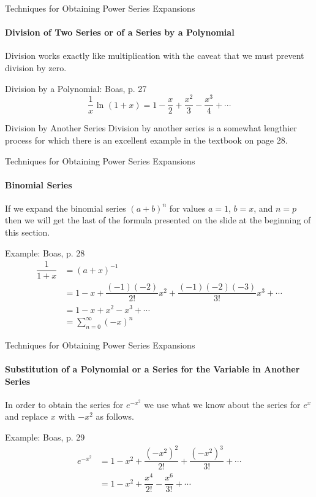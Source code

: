 \documentclass{beamer}
\begin{document}
\begin{frame}{Techniques for Obtaining Power Series Expansions}
    	\framesubtitle{Division of Two Series or of a Series by a Polynomial}
	Division works exactly like multiplication with the caveat that we must prevent division by zero.
    	\begin{exampleblock}{Division by a Polynomial: Boas, p. 27}
	\[ \dfrac{1}{x}\mbox{~ln\ }(1+x) = 1 - \dfrac{x}{2} + \dfrac{x^{2}}{3} - \dfrac{x^{3}}{4} + \cdots \]
	\end{exampleblock}
	\begin{block}{Division by Another Series}
    	Division by another series is a somewhat lengthier process for which there is an excellent example in the textbook on page 28.
	\end{block}
\end{frame}
  
\begin{frame}{Techniques for Obtaining Power Series Expansions}
    	\framesubtitle{Binomial Series}
	If we expand the binomial series $(a+b)^{n}$ for values $a=1$, $b=x$, and $n=p$ then we will get the last of the formula presented on the slide at the beginning of this section.
	\begin{exampleblock}{Example: Boas, p. 28}
	\begin{align*}
	\dfrac{1}{1+x} &= (a+x)^{-1} \\
	&= 1-x+\dfrac{(-1)(-2)}{2!}x^{2}+\dfrac{(-1)(-2)(-3)}{3!}x^{3}+\cdots \\
	&= 1-x+x^{2}-x^{3}+\cdots \\
	&= \sum\limits_{n=0}^{\infty}(-x)^{n}
	\end{align*}
	\end{exampleblock}
\end{frame}
  
\begin{frame}{Techniques for Obtaining Power Series Expansions}
    	\framesubtitle{Substitution of a Polynomial or a Series for the Variable in Another Series}
	In order to obtain the series for $e^{-x^{2}}$ we use what we know about the series for $e^{x}$ and replace $x$ with $-x^{2}$ as follows.
	\begin{exampleblock}{Example: Boas, p. 29}
	\begin{align*}
	e^{-x^{2}} &= 1-x^{2}+\dfrac{(-x^{2})^{2}}{2!}+\dfrac{(-x^{2})^{3}}{3!}+\cdots \\
	&= 1-x^{2}+\dfrac{x^{4}}{2!}-\dfrac{x^{6}}{3!}+\cdots
	\end{align*}
	\end{exampleblock}
\end{frame}
  
\end{document}
